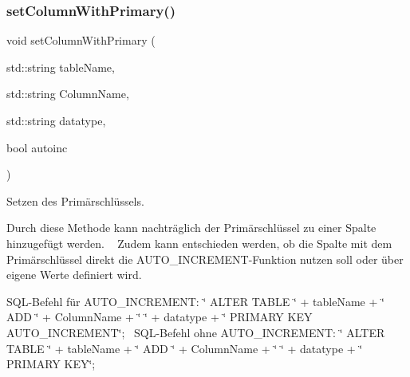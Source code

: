 \subsubsection{set\+Column\+With\+Primary()}
{\footnotesize\ttfamily void set\+Column\+With\+Primary (\begin{DoxyParamCaption}\item[{std\+::string}]{table\+Name,  }\item[{std\+::string}]{Column\+Name,  }\item[{std\+::string}]{datatype,  }\item[{bool}]{autoinc }\end{DoxyParamCaption})}



Setzen des Primärschlüssels. 

Durch diese Methode kann nachträglich der Primärschlüssel zu einer Spalte hinzugefügt werden. ~\newline
 Zudem kann entschieden werden, ob die Spalte mit dem Primärschlüssel direkt die A\+U\+T\+O\+\_\+\+I\+N\+C\+R\+E\+M\+E\+N\+T-\/\+Funktion nutzen soll oder über eigene Werte definiert wird.~\newline


S\+Q\+L-\/\+Befehl für A\+U\+T\+O\+\_\+\+I\+N\+C\+R\+E\+M\+E\+NT\+: \char`\"{} A\+L\+T\+E\+R T\+A\+B\+L\+E \char`\"{} + table\+Name + \char`\"{} A\+D\+D \char`\"{} + Column\+Name + \char`\"{} \char`\"{} + datatype + \char`\"{} P\+R\+I\+M\+A\+R\+Y K\+E\+Y A\+U\+T\+O\+\_\+\+I\+N\+C\+R\+E\+M\+E\+N\+T\char`\"{};~\newline
 S\+Q\+L-\/\+Befehl ohne A\+U\+T\+O\+\_\+\+I\+N\+C\+R\+E\+M\+E\+NT\+: \char`\"{} A\+L\+T\+E\+R T\+A\+B\+L\+E \char`\"{} + table\+Name + \char`\"{} A\+D\+D \char`\"{} + Column\+Name + \char`\"{} \char`\"{} + datatype + \char`\"{} P\+R\+I\+M\+A\+R\+Y K\+E\+Y\char`\"{};


